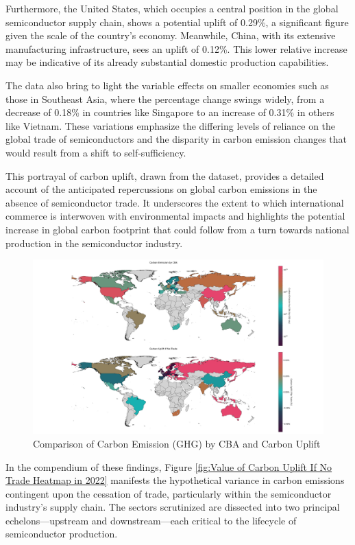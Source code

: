 Furthermore, the United States, which occupies a central position in the global semiconductor supply chain, shows a potential uplift of 0.29\%, a significant figure given the scale of the country's economy. Meanwhile, China, with its extensive manufacturing infrastructure, sees an uplift of 0.12\%. This lower relative increase may be indicative of its already substantial domestic production capabilities.

The data also bring to light the variable effects on smaller economies such as those in Southeast Asia, where the percentage change swings widely, from a decrease of 0.18\% in countries like Singapore to an increase of 0.31\% in others like Vietnam. These variations emphasize the differing levels of reliance on the global trade of semiconductors and the disparity in carbon emission changes that would result from a shift to self-sufficiency.

This portrayal of carbon uplift, drawn from the dataset, provides a detailed account of the anticipated repercussions on global carbon emissions in the absence of semiconductor trade. It underscores the extent to which international commerce is interwoven with environmental impacts and highlights the potential increase in global carbon footprint that could follow from a turn towards national production in the semiconductor industry.
\ifincludefigures
\begin{figure}
  \centering
  \includegraphics[width=\linewidth]{figures/Graph/Comparison of Carbon Emission (GHG) by CBA and Carbon Uplift.png}
 \caption{Comparison of  Carbon Emission (GHG) by CBA and Carbon Uplift}\label{fig:Comparison of  Carbon Emission (GHG) by CBA and Carbon Uplift}
\end{figure}
\fi

In the compendium of these findings, Figure \ref{fig:Value of Carbon Uplift If No Trade Heatmap in 2022} manifests the hypothetical variance in carbon emissions contingent upon the cessation of trade, particularly within the semiconductor industry's supply chain. The sectors scrutinized are dissected into two principal echelons—upstream and downstream—each critical to the lifecycle of semiconductor production.

